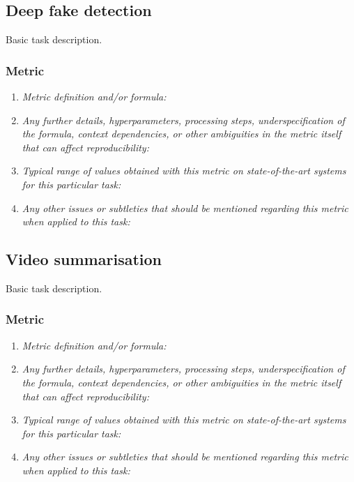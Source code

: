 \documentclass[a4paper,11pt]{article}
\begin{document}
    \subsection{Deep fake detection}
        Basic task description.
        \subsubsection{Metric}
            \begin{enumerate}[label=\alph*.]
                \item \textit{Metric definition and/or formula:}
                \bigskip
                \item \textit{Any further details, hyperparameters, processing steps, underspecification of the formula, context dependencies, or other ambiguities in the metric itself that can affect reproducibility:}
                \bigskip
                \item \textit{Typical range of values obtained with this metric on state-of-the-art systems for this particular task:}
                \bigskip
                \item \textit{Any other issues or subtleties that should be mentioned regarding this metric when applied to this task:}
                \bigskip
            \end{enumerate}

    \subsection{Video summarisation}
    Basic task description.
    \subsubsection{Metric}
        \begin{enumerate}[label=\alph*.]
            \item \textit{Metric definition and/or formula:}
            \bigskip
            \item \textit{Any further details, hyperparameters, processing steps, underspecification of the formula, context dependencies, or other ambiguities in the metric itself that can affect reproducibility:}
            \bigskip
            \item \textit{Typical range of values obtained with this metric on state-of-the-art systems for this particular task:}
            \bigskip
            \item \textit{Any other issues or subtleties that should be mentioned regarding this metric when applied to this task:}
            \bigskip
        \end{enumerate}
\end{document}
